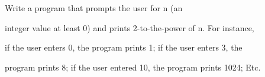 Write a program that prompts the user for n (an

integer value at least 0) and prints 2-to-the-power of n. For instance,

if the user enters 0, the program prints 1; if the user enters 3, the

program prints 8; if the user entered 10, the program prints 1024; Etc.

